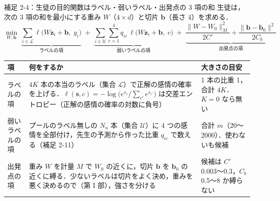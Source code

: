 \begin{frame}{補足 2-4：生徒の目的関数はラベル・弱いラベル・出発点の 3 項の和}
  \label{s:p2:obj}
  \tighteq\scriptsize
  生徒は，次の 3 項の和を最小にする重み $W$（$4\times d$）と切片 $\mathbf b$（長さ 4）を求める．
  \[
    \min_{W,\mathbf b}\;
    \underbrace{\sum_{i\in\mathcal L}\ell\bigl(W\mathbf z_i+\mathbf b,\;y_i\bigr)}_{\text{ラベルの項}}
    \;+\;\underbrace{\sum_{i\in\mathcal U}\sum_{c=1}^{4} q_{ic}\,\ell\bigl(W\mathbf z_i+\mathbf b,\;c\bigr)}_{\text{弱いラベルの項}}
    \;+\;\underbrace{\frac{\|W-W_0\|_M^2}{2C'}+\frac{\|\mathbf b-\mathbf b_0\|^2}{2C_b}}_{\text{出発点の項}}
  \]
  \centering
  \setlength{\tabcolsep}{4pt}\renewcommand{\arraystretch}{1.0}
  \begin{tabular}{@{}l p{7.9cm} p{3.6cm}@{}}
    \toprule
    項 & 何をするか & 大きさの目安 \\
    \midrule
    ラベルの項 & $4K$ 本の本当のラベル（集合 $\mathcal L$）で正解の感情の確率を上げる．$\ell(\mathbf s, c) = -\log\bigl(e^{s_c}/\textstyle\sum_{c'} e^{s_{c'}}\bigr)$ は交差エントロピー（正解の感情の確率の対数に負号） & 1 本の比重 1，合計 $4K$．$K=0$ なら無い \\
    弱いラベルの項 & プールのラベル無しの $N_u$ 本（集合 $\mathcal U$）に 4 つの感情を全部付け，先生の予測から作った比重 $q_{ic}$ で数える（補足 2-11） & 合計 $m$（20〜2000）．使わないも候補 \\
    出発点の項 & 重み $W$ を計量 $M$ で $W_0$ の近くに，切片 $\mathbf b$ を $\mathbf b_0$ の近くに縛る．少ないラベルは切片をよく決め，重みを悪く決めるので（第 I 部），強さを分ける & 候補は $C'$ 0.003〜0.3，$C_b$ 0.5〜8 か縛らない \\
    \bottomrule
  \end{tabular}\par
  \vspace{0.3em}
\end{frame}


